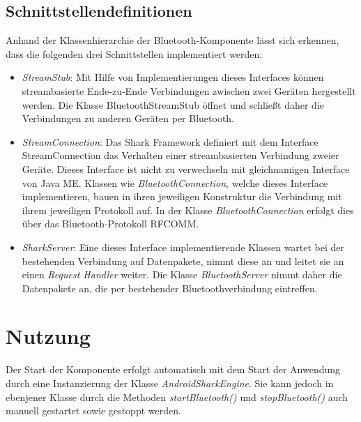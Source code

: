 \subsection{Schnittstellendefinitionen}\label{ch:bluetoothinterfaces}
Anhand der Klassenhierarchie der Bluetooth-Komponente lässt sich erkennen, dass die folgenden drei Schnittstellen implementiert werden:
\begin{itemize}
	\item \textit{StreamStub}: Mit Hilfe von Implementierungen dieses Interfaces können streambasierte Ende-zu-Ende Verbindungen zwischen zwei Geräten hergestellt werden. Die Klasse BluetoothStreamStub öffnet und schließt daher die Verbindungen zu anderen Geräten per Bluetooth.
	\item \textit{StreamConnection}: Das Shark Framework definiert mit dem Interface StreamConnection das Verhalten einer streambasierten Verbindung zweier Geräte. Dieses Interface ist nicht zu verwechseln mit gleichnamigen Interface von Java ME. Klassen wie \textit{BluetoothConnection}, welche dieses Interface implementieren, bauen in ihren jeweiligen Konstruktur die Verbindung mit ihrem jeweiligen Protokoll auf. In der Klasse \textit{BluetoothConnection} erfolgt dies über das Bluetooth-Protokoll RFCOMM.
	\item \textit{SharkServer}: Eine dieses Interface implementierende Klassen wartet bei der bestehenden Verbindung auf Datenpakete, nimmt diese an und leitet sie an einen \textit{Request Handler} weiter. Die Klasse \textit{BluetoothServer} nimmt daher die Datenpakete an, die per bestehender Bluetoothverbindung eintreffen.

\end{itemize}

\section{Nutzung}
Der Start der Komponente erfolgt automatisch mit dem Start der Anwendung durch eine Instanzierung der Klasse \textit{AndroidSharkEngine}. Sie kann jedoch in ebenjener Klasse durch die Methoden \textit{startBluetooth()} und \textit{stopBluetooth()} auch manuell gestartet sowie gestoppt werden.

